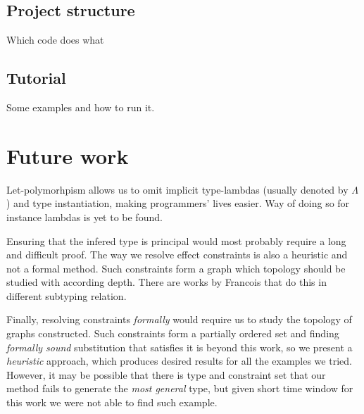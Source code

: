\documentclass[declaration,shortabstract]{iithesis}
\theoremstyle{definition} \newtheorem{definition}{Definition}[section]
\begin{document}
\section{Project structure}
Which code does what

\section{Tutorial}
Some examples and how to run it.

\chapter{Future work}
Let-polymorhpism allows us to omit implicit type-lambdas
(usually denoted by $\Lambda$) and type instantiation, making programmers'
lives easier.
Way of doing so for instance lambdas is yet to be found.

Ensuring that the infered type is principal would most probably require a long
and difficult proof. The way we resolve effect constraints is also a heuristic
and not a formal method. Such constraints form a graph which topology should be
studied with according depth. There are works by Francois that do this in different
subtyping relation.

Finally, resolving constraints \textit{formally} would require us to study
the topology of graphs constructed.
Such constraints form a partially ordered set and finding \textit{formally sound}
substitution that satisfies it is beyond this work, so we present
a  \textit{heuristic} approach, which produces desired results for all the examples we tried.
However, it may be possible that there is type and constraint set that our method
fails to generate the \textit{most general} type, but given short time window for
this work we were not able to find such example.

\end{document}
